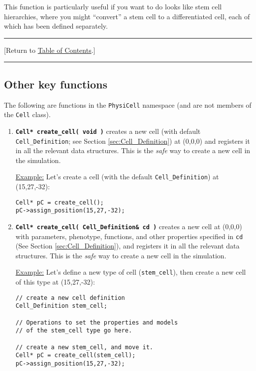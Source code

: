 \documentclass[12pt]{article}
\renewcommand{\v}{\verb}
\newcommand{\smallcode}[1]{\textbf{\texttt{#1}}}
\newcommand{\TOClink}{\begin{center}\hrule\vskip-5pt\phantom{.}\hfill[Return to \hyperlink{TOC}{Table of Contents}.]\hfill\phantom{.}\vskip3pt\hrule\end{center}}
\begin{document}
\begin{enumerate}
This function is particularly useful if you want to do looks like stem cell hierarchies, where you 
might ``convert'' a stem cell to a differentiated cell, each of which has been defined 
separately. 

\end{enumerate} 

\TOClink 

\subsection{Other key functions}
\label{sec:other_key_cell_functions}
The following are functions in the \v|PhysiCell| namespace 
(and are not members of the \v|Cell| class). 

\begin{enumerate}

\item 
\smallcode{Cell* create\_cell( void )} creates a new cell (with 
default \v|Cell_Definition|; see Section \ref{sec:Cell_Definition}) at 
(0,0,0) and registers it in all the relevant data structures. 
This is the \emph{safe} way to create a new cell in the simulation. 

\underline{Example:} Let's create a cell (with the default 
\v|Cell_Definition|) at (15,27,-32): 

\begin{verbatim}
Cell* pC = create_cell(); 
pC->assign_position(15,27,-32);
\end{verbatim}

\item 
\smallcode{Cell* create\_cell( Cell\_Definition\& cd )} 
creates a new cell at (0,0,0) with parameters, phenotype, functions, 
and other properties specified in \v|cd| 
(See Section \ref{sec:Cell_Definition}),  and registers it in all the 
relevant data structures. 
This is the \emph{safe} way to create a new cell in the simulation. 

\underline{Example:} Let's define a new type of cell (\v|stem_cell|), then 
create a new cell of this type at (15,27,-32): 

\begin{verbatim}
// create a new cell definition 
Cell_Definition stem_cell; 

// Operations to set the properties and models 
// of the stem_cell type go here. 

// create a new stem_cell, and move it. 
Cell* pC = create_cell(stem_cell); 
pC->assign_position(15,27,-32);
\end{verbatim}


\end{enumerate}
\end{document}
